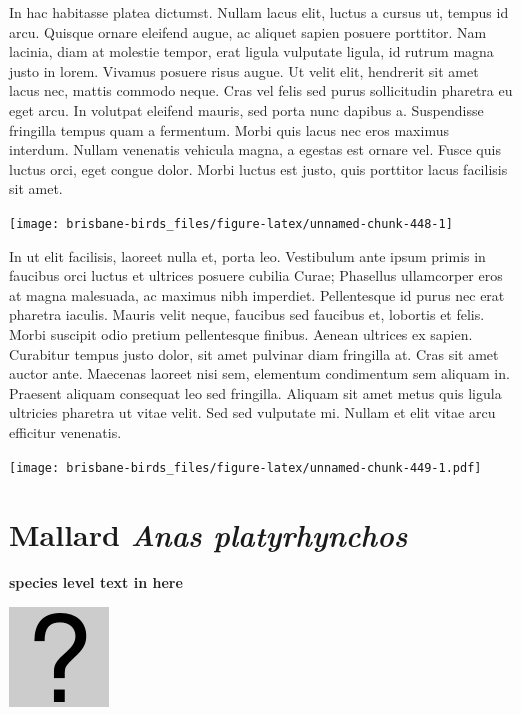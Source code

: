 \documentclass[]{book}
\let\origfigure\figure
\let\endorigfigure\endfigure
\renewenvironment{figure}[1][2] {
  \expandafter\origfigure\expandafter[H]
} {
  \endorigfigure
}
\begin{document}
In hac habitasse platea dictumst. Nullam lacus elit, luctus a cursus ut,
tempus id arcu. Quisque ornare eleifend augue, ac aliquet sapien posuere
porttitor. Nam lacinia, diam at molestie tempor, erat ligula vulputate
ligula, id rutrum magna justo in lorem. Vivamus posuere risus augue. Ut
velit elit, hendrerit sit amet lacus nec, mattis commodo neque. Cras vel
felis sed purus sollicitudin pharetra eu eget arcu. In volutpat eleifend
mauris, sed porta nunc dapibus a. Suspendisse fringilla tempus quam a
fermentum. Morbi quis lacus nec eros maximus interdum. Nullam venenatis
vehicula magna, a egestas est ornare vel. Fusce quis luctus orci, eget
congue dolor. Morbi luctus est justo, quis porttitor lacus facilisis sit
amet.

\begin{figure}
\texttt{[image: brisbane-birds\_files/figure-latex/unnamed-chunk-448-1]} \caption{insert figure caption}\label{fig:unnamed-chunk-448}
\end{figure}

In ut elit facilisis, laoreet nulla et, porta leo. Vestibulum ante ipsum
primis in faucibus orci luctus et ultrices posuere cubilia Curae;
Phasellus ullamcorper eros at magna malesuada, ac maximus nibh
imperdiet. Pellentesque id purus nec erat pharetra iaculis. Mauris velit
neque, faucibus sed faucibus et, lobortis et felis. Morbi suscipit odio
pretium pellentesque finibus. Aenean ultrices ex sapien. Curabitur
tempus justo dolor, sit amet pulvinar diam fringilla at. Cras sit amet
auctor ante. Maecenas laoreet nisi sem, elementum condimentum sem
aliquam in. Praesent aliquam consequat leo sed fringilla. Aliquam sit
amet metus quis ligula ultricies pharetra ut vitae velit. Sed sed
vulputate mi. Nullam et elit vitae arcu efficitur venenatis.

\begin{figure}
\centering
\texttt{[image: brisbane-birds\_files/figure-latex/unnamed-chunk-449-1.pdf]}
\caption{\label{fig:unnamed-chunk-449}insert figure caption}
\end{figure}

\section{\texorpdfstring{Mallard \emph{Anas
platyrhynchos}}{Mallard Anas platyrhynchos}}\label{mallard-anas-platyrhynchos}

\textbf{species level text in here}

\begin{figure}
\centering
\includegraphics{assets/missing.png}
\caption{No image for species}
\end{figure}
\end{document}
